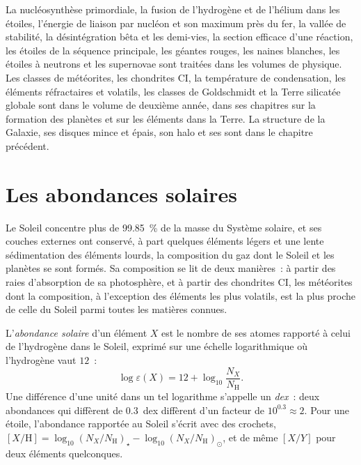 \begin{recall}
La nucléosynthèse primordiale, la fusion de l'hydrogène et de l'hélium dans les étoiles,
l'énergie de liaison par nucléon et son maximum près du fer, la vallée de
stabilité, la désintégration bêta et les demi-vies, la section efficace d'une réaction,
les étoiles de la séquence principale, les géantes rouges, les naines blanches, les étoiles à neutrons et
les supernovae sont traitées dans les volumes de physique. Les classes de météorites, les chondrites
CI, la température de condensation, les éléments réfractaires et
volatils, les classes de Goldschmidt et la Terre silicatée globale sont dans le
volume de deuxième année, dans ses chapitres sur la formation des planètes et sur
les éléments dans la Terre. La structure de la Galaxie, ses disques
mince et épais, son halo et ses  sont dans le
chapitre précédent.
\end{recall}

\section{Les abondances solaires}\label{sec:b3:origin-of-elements:solar}

Le Soleil concentre plus de \qty{99.85}{\percent} de la masse du Système
solaire, et ses couches externes ont conservé, à part quelques éléments légers
et une lente sédimentation des éléments lourds, la composition du gaz dont
le Soleil et les planètes se sont formés. Sa composition se lit de deux manières~:
à partir des raies d'absorption de sa photosphère, et à partir des chondrites CI,
les météorites dont la composition, à l'exception des éléments les plus
volatils, est la plus proche de celle du Soleil parmi toutes les matières connues.

\begin{definition}\label{def:b3:origin-of-elements:abundance}
L'\emph{abondance solaire} d'un élément $X$ est
le nombre de ses atomes rapporté à celui de l'hydrogène dans le Soleil,
exprimé sur une échelle logarithmique où l'hydrogène vaut $12$~:
\[
\log\varepsilon(X) = 12 + \log_{10}\frac{N_X}{N_\mathrm{H}} .
\]
Une différence d'une unité dans un tel logarithme s'appelle un
\emph{dex}~: deux abondances qui diffèrent de $0.3$~dex diffèrent d'un
facteur de $10^{0.3} \approx 2$. Pour une étoile, l'abondance rapportée au
Soleil s'écrit avec des crochets,
$[X/\mathrm{H}] = \log_{10}(N_X/N_\mathrm{H})_\star -
\log_{10}(N_X/N_\mathrm{H})_\odot$, et de même $[X/Y]$ pour deux
éléments quelconques.
\end{definition}

